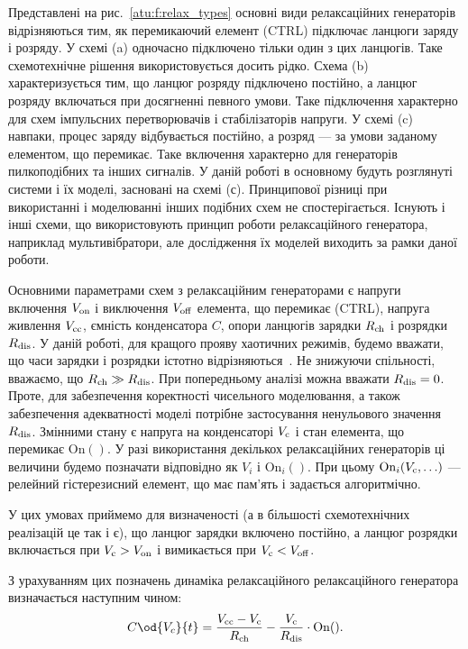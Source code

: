 Представлені на рис.~\ref{atu:f:relax_types} основні види релаксаційних
генераторів відрізняються тим, як перемикаючий елемент
(CTRL) підключає ланцюги заряду і розряду. У схемі (a)
одночасно підключено тільки один з цих ланцюгів. Таке
схемотехнічне рішення використовується досить рідко. Схема (b)
характеризується тим, що ланцюг розряду підключено постійно,
а ланцюг розряду включаться при досягненні певного умови. Таке
підключення характерно для схем імпульсних перетворювачів і
стабілізаторів напруги. У схемі (c) навпаки, процес заряду
відбувається постійно, а розряд --- за умови заданому
елементом, що перемикає. Таке включення характерно для
генераторів пилкоподібних та інших сигналів. У даній роботі в
основному будуть розглянуті системи і їх моделі, засновані на
схемі (с). Принципової різниці при використанні і моделюванні
інших подібних схем не спостерігається. Існують і інші схеми,
що використовують принцип роботи релаксаційного генератора,
наприклад мультивібратори, але дослідження їх моделей виходить
за рамки даної роботи.



Основними параметрами схем з релаксаційним генераторами є
напруги включення
$V _\mathrm{on} $ і виключення
$V _\mathrm{off} $ елемента, що перемикає (CTRL), напруга живлення
$V _\mathrm{cc} $, ємність конденсатора
$C $, опори ланцюгів зарядки
$R _\mathrm{ch} $ і розрядки
$R _\mathrm{dis} $. У даній роботі, для кращого прояву хаотичних
режимів, будемо вважати, що часи зарядки і розрядки істотно
відрізняються~\cite{atu_asau19}. Не знижуючи спільності, вважаємо, що
$R _\mathrm{ch} \gg R _\mathrm{dis} $. При попередньому аналізі можна вважати
$R _\mathrm{dis} = 0 $. Проте, для забезпечення коректності чисельного
моделювання, а також забезпечення адекватності моделі потрібне
застосування ненульового значення
$R _\mathrm{dis} $. Змінними стану є напруга на конденсаторі
$V _\mathrm{c} $ і стан елемента, що перемикає
$\mathrm{On}()$. У разі використання декількох релаксаційних
генераторів ці величини будемо позначати відповідно як
$V_{i} $ і
$\mathrm{On}_{i}() $. При цьому
$\mathrm{On}_{i}(V _\mathrm{c}, \ldots) $ --- релейний гістерезисний елемент, що
має пам'ять і задається алгоритмічно.

У цих умовах приймемо для визначеності (а в більшості
схемотехнічних реалізацій це так і є), що ланцюг зарядки включено
постійно, а ланцюг розрядки включається при
$V _\mathrm{c}> V _\mathrm{on} $ і вимикається при
$V _\mathrm{c} <V _\mathrm{off} $.

З урахуванням цих позначень динаміка релаксаційного релаксаційного
генератора визначається наступним чином:
%
\begin{equation}
  C \od{V_c}{t}
  =
  \frac{V\Tidx{cc} - V\Tidx{c}}{R\Tidx{ch}}
  - \frac{V\Tidx{c}}{R\Tidx{dis}} \cdot \mathrm{On}().
  \label{atu:eq:relax0}
\end{equation}

